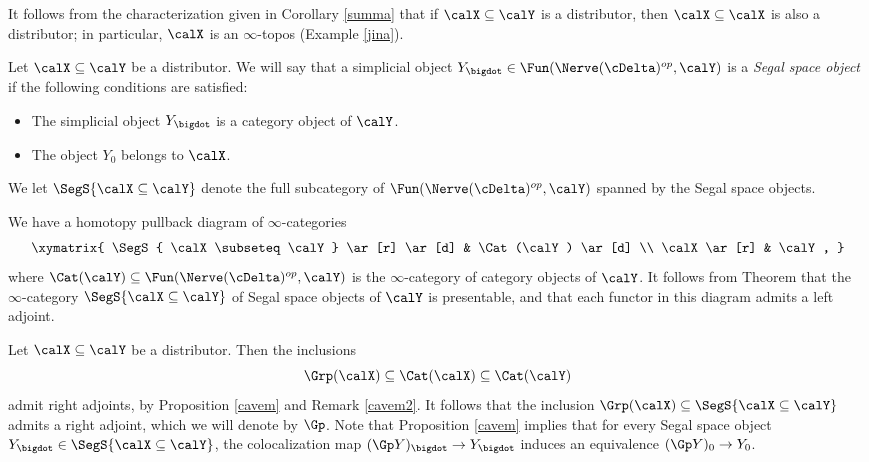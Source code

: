 \begin{remark}
It follows from the characterization given in Corollary \ref{summa} that if $\calX \subseteq \calY$ is
a distributor, then $\calX \subseteq \calX$ is also a distributor; in particular, $\calX$ is an $\infty$-topos
(Example \ref{jina}).
\end{remark}

\begin{definition}
Let $\calX \subseteq \calY$ be a distributor. We will say that a simplicial object
$Y_{\bigdot} \in \Fun( \Nerve(\cDelta)^{op}, \calY)$ is a {\it Segal space object} if the following conditions are satisfied:
\begin{itemize}
\item[$(1)$] The simplicial object $Y_{\bigdot}$ is a category object of $\calY$.
\item[$(2)$] The object $Y_0$ belongs to $\calX$.
\end{itemize}
We let $\SegS{\calX \subseteq \calY}$ denote the full subcategory of $\Fun( \Nerve(\cDelta)^{op}, \calY)$ spanned by the Segal space objects.
\end{definition}

\begin{remark}
We have a homotopy pullback diagram of $\infty$-categories
$$ \xymatrix{ \SegS{ \calX \subseteq \calY} \ar[r] \ar[d] & \Cat(\calY) \ar[d] \\
\calX \ar[r] & \calY, }$$
where $\Cat(\calY) \subseteq \Fun( \Nerve(\cDelta)^{op}, \calY)$ is the $\infty$-category of category objects of $\calY$. It follows from Theorem  that the $\infty$-category
$\SegS{ \calX \subseteq \calY}$ of Segal space objects of $\calY$ is presentable, and that each
functor in this diagram admits a left adjoint.
\end{remark}

\begin{notation}\label{righton}
Let $\calX \subseteq \calY$ be a distributor. Then the inclusions
$$ \Grp(\calX) \subseteq \Cat(\calX) \subseteq \Cat(\calY)$$
admit right adjoints, by Proposition \ref{cavem} and Remark \ref{cavem2}. It follows that the inclusion
$\Grp(\calX) \subseteq \SegS{\calX \subseteq \calY}$ admits a right adjoint, which we will denote by
$\Gp$. Note that Proposition \ref{cavem} implies that for every Segal space object $Y_{\bigdot}
\in \SegS{ \calX \subseteq \calY}$, the colocalization map $(\Gp Y)_{\bigdot} \rightarrow Y_{\bigdot}$
induces an equivalence $(\Gp Y)_0 \rightarrow Y_0$.
\end{notation}

